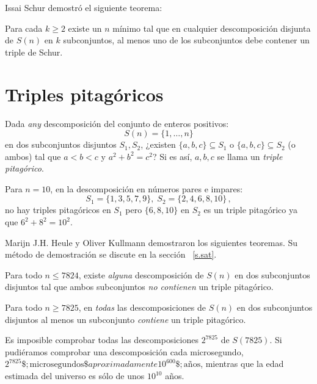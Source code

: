 Issai Schur demostró el siguiente teorema:
\begin{theorem}[Schur]
Para cada $k\geq 2$ existe un $n$ mínimo tal que en cualquier descomposición disjunta de $S(n)$ en $k$ subconjuntos, al menos uno de los subconjuntos debe contener un triple de Schur.
\end{theorem}


\section{Triples pitagóricos}\label{s.pyth}

\begin{definition}
Dada \emph{any} descomposición del conjunto de enteros positivos:
\[
S(n)=\{1,\ldots,n\}
\]
en dos subconjuntos disjuntos $S_1,S_2$, ¿existen $\{a,b,c\}\subseteq S_1$ o $\{a,b,c\}\subseteq S_2$ (o ambos) tal que $a\!<\!b\!<\!c$ y $a^2+b^2=c^2$? Si es así, $ {a,b,c}$ se llama un \emph{triple pitagórico}.
\end{definition}

\begin{example}
Para $n=10$, en la descomposición en números pares e impares:
\[
S_1 = \{1,3,5,7,9\},\; S_2=\{2,4,6,8,10\}\,,
\]
no hay triples pitagóricos en $S_1$ pero $\{6,8,10\}$ en $S_2$ es un triple pitagórico ya que $6^2+8^2=10^2$.
\end{example}

Marijn J.H. Heule y Oliver Kullmann demostraron los siguientes teoremas. Su método de demostración se discute en la sección ~\ref{s.sat}.

\begin{theorem}
Para todo $n\leq 7824$, existe \emph{alguna} descomposición de $S(n)$ en dos subconjuntos disjuntos tal que ambos subconjuntos \emph{no contienen} un triple pitagórico.
\end{theorem}

\begin{theorem}
Para todo $n\geq 7825$, en \emph{todas} las descomposiciones de $S(n)$ en dos subconjuntos disjuntos al menos un subconjunto \emph{contiene} un triple pitagórico.
\end{theorem}
Es imposible comprobar todas las descomposiciones $2^{7825}$ de $S(7825)$. Si pudiéramos comprobar una descomposición cada microsegundo, $2^{7825}\$; \textrm{microsegundos}\$aproximadamente 10^{600}\$; \textrm{años}$, mientras que la edad estimada del universo es sólo de unos $10^{10}$ años.

